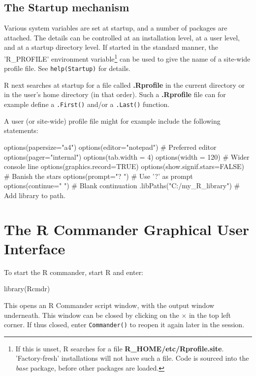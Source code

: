 \documentclass{tufte-book}\usepackage[]{graphicx}\usepackage[]{color}
\newcommand{\txtt}[1]{\texttt{#1}}
\begin{document}
\section{The Startup mechanism}

Various system variables are set at startup, and a number of packages
are attached.  The details can be controlled at an installation level,
at a user level, and at a startup directory level.  If started in the
standard manner, the 'R\_PROFILE' environment variable\footnote{If
  this is unset, R searches for a file {\bf
    R\_HOME/etc/Rprofile.site}.  'Factory-fresh' installations will
  not have such a file.  Code is sourced into the \textit{base}
  package, before other packages are loaded.} can be used to give the
name of a site-wide profile file.  See \txtt{help(Startup)} for
details.

R next searches at startup for a file called \textbf{.Rprofile} in the
current directory or in the user's home directory (in that
order).
Such a \textbf{.Rprofile} file can for example define a
\txtt{.First()} and/or a \txtt{.Last()} function.

A user (or site-wide) profile file might for example include the
following statements:
\begin{Schunk}
\begin{Sinput}
options(papersize="a4")
options(editor="notepad")         # Preferred editor
options(pager="internal")
options(tab.width = 4)
options(width = 120)              # Wider console line
options(graphics.record=TRUE)
options(show.signif.stars=FALSE)  # Banish the stars
options(prompt="? ")              # Use '?' as prompt
options(continue="  ")            # Blank continuation
.libPaths("C:/my_R_library")      # Add library to path.
\end{Sinput}
\end{Schunk}
\cleartooddpage

\chapter{The R Commander Graphical User Interface}





To start the R commander, start R and enter:
\begin{Schunk}
\begin{Sinput}
library(Rcmdr)
\end{Sinput}
\end{Schunk}
This opens an R Commander script window, with the output window
underneath.  
This window can be closed by clicking on the {\large
  \texttt{$\times$}} in the top left corner. If thus closed,
enter \txtt{Commander()} to reopen it again later in the session.
\end{document}

